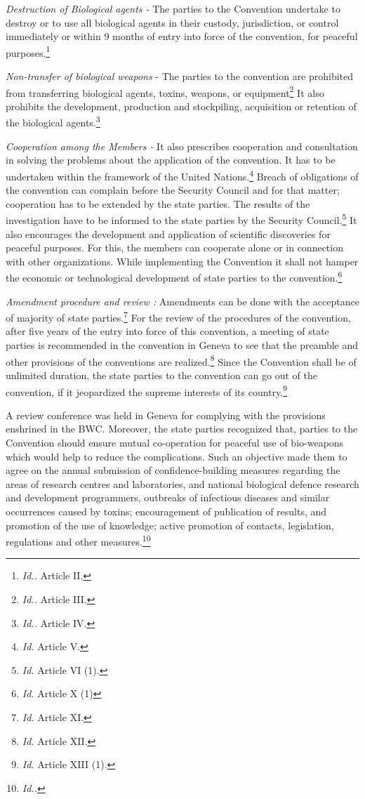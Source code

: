 \begin{multicols}{2}
\noi
\textit{Destruction of Biological agents -} The parties to the Convention undertake to destroy or to use
all biological agents in their custody, jurisdiction, or control immediately or within 9 months
of entry into force of the convention, for peaceful purposes.\footnote{\textit{Id..} Article II.} 

\noi
\textit{Non-transfer of biological weapons} - The parties to the convention are prohibited from
transferring biological agents, toxins, weapons, or equipment\footnote{\textit{Id..} Article III. } It also prohibits the
development, production and stockpiling, acquisition or retention of the biological agents.\footnote{\textit{Id..} Article IV. }

\noi
\textit{Cooperation among the Members -} It also prescribes cooperation and consultation in solving
the problems about the application of the convention. It has to be undertaken within the
framework of the United Nations.\footnote{\textit{Id.} Article V.} Breach of obligations of the convention can complain
before the Security Council and for that matter; cooperation has to be extended by the state
parties. The results of the investigation have to be informed to the state parties by the
Security Council.\footnote{\textit{Id.} Article VI (1).} It also encourages the development and application of scientific
discoveries for peaceful purposes. For this, the members can cooperate alone or in connection 
with other organizations. While implementing the Convention it shall not hamper the
economic or technological development of state parties to the convention.\footnote{\textit{Id.} Article X (1)}

\noi
\textit{Amendment procedure and review :} Amendments can be done with the acceptance of majority
of state parties.\footnote{\textit{Id.} Article XI.} For the review of the procedures of the convention, after five years of the
entry into force of this convention, a meeting of state parties is recommended in the
convention in Geneva to see that the preamble and other provisions of the conventions are
realized.\footnote{\textit{Id.} Article XII.} Since the Convention shall be of unlimited duration, the state parties to the
convention can go out of the convention, if it jeopardized the supreme interests of its
country.\footnote{\textit{Id.} Article XIII (1).}

\noi
A review conference was held in Geneva for complying with the provisions enshrined in the
BWC. Moreover, the state parties recognized that, parties to the Convention should ensure
mutual co-operation for peaceful use of bio-weapons which would help to reduce the
complications. Such an objective made them to agree on the annual submission of
confidence-building measures regarding the areas of research centres and laboratories, and
national biological defence research and development programmers, outbreaks of infectious
diseases and similar occurrences caused by toxins; encouragement of publication of results,
and promotion of the use of knowledge; active promotion of contacts, legislation, regulations
and other measures.\footnote{\textit{Id..}}


\end{multicols}
